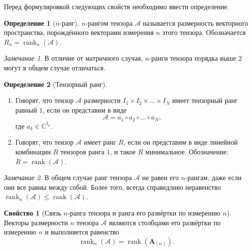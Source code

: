 \documentclass[specialist,
    substylefile = spbu_report.rtx,
    subf,href,colorlinks=true, 12pt]{disser}
\theoremstyle{plain}
\theoremstyle{definition}
\newtheorem{definition}{Определение}[section]
\newtheorem{property}{Свойство}[section]
\theoremstyle{remark}
\newtheorem*{remark}{Замечание}
\begin{document}
    Перед формулировкой следующих свойств необходимо ввести определение.
    \begin{definition}[$n$-ранг]
        $n$-рангом тензора $\mathcal{A}$ называется размерность векторного пространства, порождённого векторами измерения $n$ этого тензора.
        Обозначается $R_n=\operatorname{rank}_{n}(\mathcal{A})$.
    \end{definition}

    \begin{remark}
        В отличие от матричного случая, $n$-ранги тензора порядка выше $2$ могут в общем случае отличаться.
    \end{remark}

    \begin{definition}[Тензорный ранг]
        \leavevmode
        \begin{enumerate}
            \item Говорят, что тензор $\mathcal{A}$ размерности $I_1\times I_2\times \ldots \times I_N$ имеет тензорный ранг равный $1$, если он представим в виде
            \[
                \mathcal{A}=a_1\circ a_2\circ \ldots \circ a_N,
            \]
            где $a_{k} \in \mathbb{C}^{I_k}$.
            \item Говорят, что тензор $\mathcal{A}$ имеет ранг $R$, если он представим в виде линейной комбинации $R$ тензоров
            ранга $1$, и такое $R$ минимальное.
            Обозначение: $R=\operatorname{rank}(\mathcal{A})$.
        \end{enumerate}
    \end{definition}

    \begin{remark}
        В общем случае ранг тензора $\mathcal{A}$ не равен его $n$-рангам, даже если они все равны между собой.
        Более того, всегда справедливо неравенство $\operatorname{rank}_n(\mathcal{A})\leqslant \operatorname{rank}(\mathcal{A})$.
    \end{remark}

    \begin{property}
        [Связь $n$-ранга тензора и ранга его развёртки по измерению $n$]
        Векторы размерности $n$ тензора $\mathcal{A}$ являются столбцами его развёртки по измерению $n$ и выполняется равенство
        \[\operatorname{rank}_{n}(\mathcal{A})=\operatorname{rank}(\mathbf{A}_{(n)}).\]
    \end{property}
\end{document}
